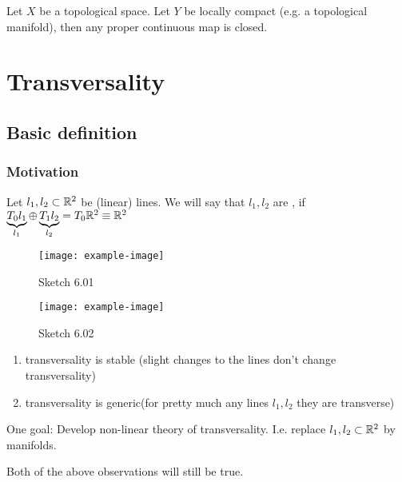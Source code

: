 \begin{lemma}\label{lem:5.7}
    Let \(X\) be a topological space. Let \(Y\) be locally compact (e.g. a topological manifold),
    then any proper continuous map %
    is closed.
\end{lemma}

\chapter{Transversality} %

\section{Basic definition}

\subsection{Motivation}

Let \(l_1,l_2\subset\mathbb{R}^2\) be (linear) lines. We will say that \(l_1,l_2\) are , if 
\(\underbrace{T_0l_1}_{l_1} \oplus \underbrace{T_1l_2}_{l_2} = T_0\mathbb{R}^2\equiv \mathbb{R}^2\)
\begin{figure}[H]
    \centering
    \texttt{[image: example-image]}
    \caption{Sketch 6.01}
\end{figure}
\begin{figure}[H]
    \centering
    \texttt{[image: example-image]}
    \caption{Sketch 6.02}
\end{figure}

\begin{enumerate}
    \item transversality is stable (slight changes to the lines don't change transversality) 
    \item transversality is generic(for pretty much any lines \(l_1,l_2\) they are transverse)
\end{enumerate}

One goal: Develop non-linear theory  of transversality. I.e. replace \(l_1,l_2\subset\mathbb{R}^2\) by manifolds.

Both of the above observations will still be true.  %


